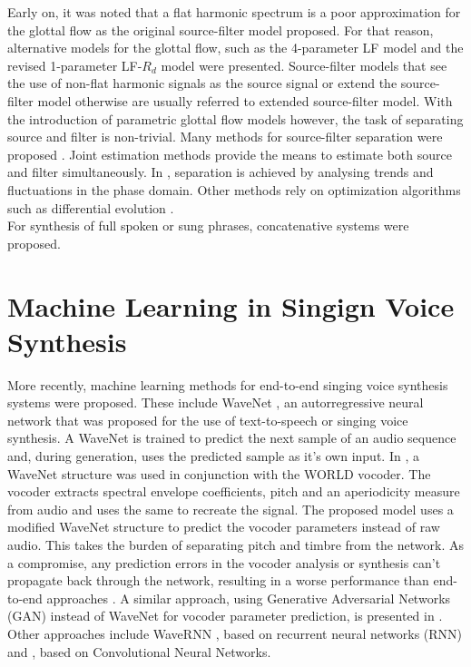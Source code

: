 Early on, it was noted that a flat harmonic spectrum is a poor approximation for the glottal flow as the original source-filter model proposed. For that reason, alternative models for the glottal flow, such as the 4-parameter LF model \cite{fant_four-parameter_1985} and the revised 1-parameter LF-$R_d$ model \cite{fant_lf-model_1995} were presented. Source-filter models that see the use of non-flat harmonic signals as the source signal or extend the source-filter model otherwise are usually referred to extended source-filter model. With the introduction of parametric glottal flow models however, the task of separating source and filter is non-trivial. Many methods for source-filter separation were proposed \cite{jinachitra_joint_2005}\cite{degottex_glottal_2010}\cite{perrotin_spectral_2019}. Joint estimation methods provide the means to estimate both source and filter simultaneously. In \cite{loweimi_source-filter_2015}, separation is achieved by analysing trends and fluctuations in the phase domain. Other methods rely on optimization algorithms such as differential evolution \cite{schleusing_joint_2013}.\\

For synthesis of full spoken or sung phrases, concatenative systems \cite{schwarz_concatenative_2006} were proposed. 

\section{Machine Learning in Singign Voice Synthesis}

More recently, machine learning methods for end-to-end singing voice synthesis systems were proposed. These include WaveNet \cite{oord_wavenet:_2016}, an autorregressive neural network that was proposed for the use of text-to-speech or singing voice synthesis. A WaveNet is trained to predict the next sample of an audio sequence and, during generation, uses the predicted sample as it's own input. In \cite{blaauw_neural_2017}, a WaveNet structure was used in conjunction with the WORLD vocoder\cite{morise_world:_2016}. The vocoder extracts spectral envelope coefficients, pitch and an aperiodicity measure from audio and uses the same to recreate the signal. The proposed model uses a modified WaveNet structure to predict the vocoder parameters instead of raw audio. This takes the burden of separating pitch and timbre from the network. As a compromise, any prediction errors in the vocoder analysis or synthesis can't propagate back through the network, resulting in a worse performance than end-to-end approaches \cite{engel_ddsp:_2020}. A similar approach, using Generative Adversarial Networks (GAN) instead of WaveNet for vocoder parameter prediction, is presented in \cite{chandna_wgansing:_2019}. Other approaches include WaveRNN \cite{kalchbrenner_efficient_2018}, based on recurrent neural networks (RNN) and \cite{nakamura_singing_2019}, based on Convolutional Neural Networks.\\

